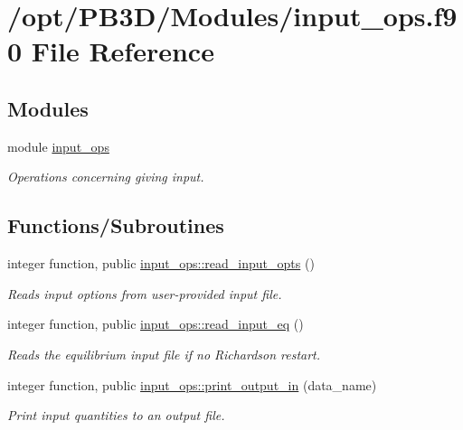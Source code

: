 \hypertarget{input__ops_8f90}{}\section{/opt/\+P\+B3\+D/\+Modules/input\+\_\+ops.f90 File Reference}
\label{input__ops_8f90}
\subsection*{Modules}
\begin{DoxyCompactItemize}
\item 
module \hyperlink{namespaceinput__ops}{input\+\_\+ops}
\begin{DoxyCompactList}\small\item\em Operations concerning giving input. \end{DoxyCompactList}\end{DoxyCompactItemize}
\subsection*{Functions/\+Subroutines}
\begin{DoxyCompactItemize}
\item 
integer function, public \hyperlink{namespaceinput__ops_a434acca4f59f9dc1d91e04f846133684}{input\+\_\+ops\+::read\+\_\+input\+\_\+opts} ()
\begin{DoxyCompactList}\small\item\em Reads input options from user-\/provided input file. \end{DoxyCompactList}\item 
integer function, public \hyperlink{namespaceinput__ops_a577c897cc266961eb40bb5ef747fa077}{input\+\_\+ops\+::read\+\_\+input\+\_\+eq} ()
\begin{DoxyCompactList}\small\item\em Reads the equilibrium input file if no Richardson restart. \end{DoxyCompactList}\item 
integer function, public \hyperlink{namespaceinput__ops_a84ec7b3833da80ebb36ae0d5ff1a9e0a}{input\+\_\+ops\+::print\+\_\+output\+\_\+in} (data\+\_\+name)
\begin{DoxyCompactList}\small\item\em Print input quantities to an output file. \end{DoxyCompactList}\end{DoxyCompactItemize}
